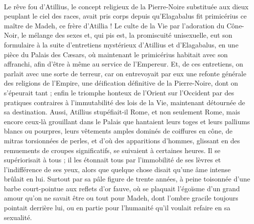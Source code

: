\documentclass[a4paper, 11pt, oneside, polutonikogreek, french]{article}
\begin{document}
\paragraph{}
Le rêve fou d'Atillius, le concept religieux de la Pierre-Noire substituée aux dieux peuplant le ciel des races, avait pris corps depuis qu'Elagabalus fit primicérius ce maître de Madeh, ce frère d'Atillia ! Le culte de la Vie par l'adoration du Cône-Noir, le mélange des sexes et, qui pis est, la promiscuité unisexuelle, eut son formulaire à la suite d'entretiens mystérieux d'Atillius et d'Elagabalus, en une pièce du Palais des Cæsars, où maintenant le primicérius habitait avec son affranchi, afin d'être à même au service de l'Empereur. Et, de ces entretiens, on parlait avec une sorte de terreur, car on entrevoyait par eux une refonte générale des religions de l'Empire, une déification définitive de la Pierre-Noire, dont on s'épeurait tant ; enfin le triomphe honteux de l'Orient sur l'Occident par des pratiques contraires à l'immutabilité des lois de la Vie, maintenant détournée de sa destination. Aussi, Atillius stupéfiait-il Rome, et non seulement Rome, mais encore ceux-là grouillant dans le Palais que hantaient leurs toges et leurs palliums blancs ou pourpres, leurs vêtements amples dominés de coiffures en cône, de mitras torsionnées de perles, et d'où des apparitions d'hommes, glissant en des remuements de croupes significatifs, se suivaient à certaines heures. Il se supériorisait à tous ; il les étonnait tous par l'immobilité de ses lèvres et l'indifférence de ses yeux, alors que quelque chose disait qu'une âme intense brûlait en lui. Surtout par sa pâle figure de trente années, à peine toisonnée d'une barbe court-pointue aux reflets d'or fauve, où se plaquait l'égoïsme d'un grand amour qu'on ne savait être ou tout pour Madeh, dont l'ombre gracile toujours pointait derrière lui, ou en partie pour l'humanité qu'il voulait refaire en sa sexualité.
\end{document}
